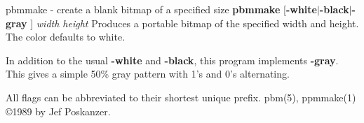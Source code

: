 pbmmake - create a blank bitmap of a specified size
{\bf pbmmake}
{\rm [}{\bf -white}{\rm $|$}{\bf -black}{\rm $|$}{\bf -gray}
{\rm ]}
{\it width height}
Produces a portable bitmap of the specified width and height.
The color defaults to white.
\par
In addition to the usual
{\bf -white}
and
{\bf -black}{\rm ,}
this program implements
{\bf -gray}{\rm .}
This gives a simple 50\% gray pattern with 1's and 0's alternating.
\par
All flags can be abbreviated to their shortest unique prefix.
pbm(5), ppmmake(1)
\copyright 1989 by Jef Poskanzer.
%
 
%

\newpage
%

